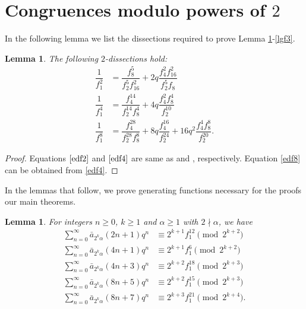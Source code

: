 \documentclass[11pt,a4paper]{article}
\numberwithin{equation}{section}
\theoremstyle{plain}
\newtheorem{lemma}[theorem]{Lemma}
\begin{document}
\section{Congruences modulo powers of $2$}\label{s3}
In the following lemma we list the dissections required to prove Lemma \ref{lgf1}-\ref{lgf3}.
\begin{lemma}\label{ld}
	The following $2$-dissections hold:
	\begin{align}
		\dfrac{1}{f_1^2}&=\dfrac{f_8^5}{f_2^5f_{16}^2}+2q\dfrac{f_4^2f_{16}^2}{f_2^5f_8} \label{edf2}\\
		\dfrac{1}{f_1^4}&=\dfrac{f_4^{14}}{f_2^{14}f_8^4}+4q\dfrac{f_4^2f_8^4}{f_2^{10}} \label{edf4}\\
		\dfrac{1}{f_1^8}&=\dfrac{f_4^{28}}{f_2^{28}f_8^8}+8q\dfrac{f_4^{16}}{f_2^{24}}+16q^2 \dfrac{f_4^4f_8^8}{f_2^{20}} \label{edf8}.	
	\end{align}
\end{lemma}
\begin{proof}
Equations $\eqref{edf2}$ and $\eqref{edf4}$ are same as {{\cite[Eq. 1.9.4]{poq}}} and {{\cite[Eq. 1.10.1]{poq}}}, respectively. Equation \eqref{edf8} can be obtained from \eqref{edf4}.
\end{proof}
In the lemmas that follow, we prove generating functions necessary for the proofs our main theorems.
\begin{lemma}\label{lgf1}
For integers $n\ge 0$, $k\ge 1$ and $\alpha\ge 1$ with $2\nmid \alpha$, we have
	\begin{align}
		\sum_{n=0}^{\infty}\bar{a}_{2^k\alpha}(2n+1)q^n&\equiv 2^{k+1}f_1^{12}\pmod{2^{k+2}}\label{e2n1}\\
			\sum_{n=0}^{\infty}\bar{a}_{2^k\alpha}(4n+1)q^n&\equiv 2^{k+1}f_1^{6}\pmod{2^{k+2}}\label{e4n1}\\
			\sum_{n=0}^{\infty}\bar{a}_{2^k\alpha}(4n+3)q^n&\equiv 2^{k+2}f_1^{18}\pmod{2^{k+3}}\label{e4n}\\
			\sum_{n=0}^{\infty}\bar{a}_{2^k\alpha}(8n+5)q^n&\equiv 2^{k+2}f_1^{15}\pmod{2^{k+3}}\label{e8n5}\\
			\sum_{n=0}^{\infty}\bar{a}_{2^k\alpha}(8n+7)q^n&\equiv 2^{k+3}f_1^{21}\pmod{2^{k+4}}\label{e8n}.
	\end{align}
\end{lemma}
\end{document}
